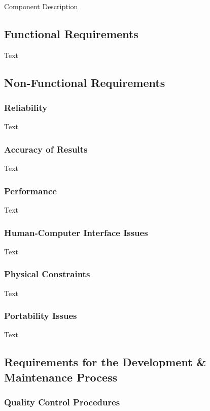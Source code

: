 \documentclass[12pt]{article}
\begin{document}
\noindent Component Description

\subsection{Functional Requirements}

Text

\subsection{Non-Functional Requirements}

\subsubsection {Reliability}

Text

\subsubsection {Accuracy of Results}
 
Text

\subsubsection {Performance}

Text

\subsubsection {Human-Computer Interface Issues}

Text

\subsubsection {Physical Constraints}

Text

\subsubsection {Portability Issues}

Text

\subsection{Requirements for the Development & Maintenance Process}

\subsubsection {Quality Control Procedures}
\end{document}
